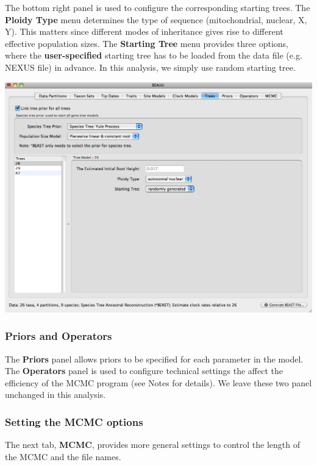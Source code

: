 \documentclass[12pt]{article}
\begin{document}
The bottom right panel is used to configure the corresponding starting trees. The \textbf{Ploidy Type} menu determines the type of sequence (mitochondrial, nuclear, X, Y). This matters since different modes of inheritance gives rise to different effective population sizes. The \textbf{Starting Tree} menu provides three options, where the \textbf{user-specified} starting tree has to be loaded from the data file (e.g. NEXUS file) in advance. In this analysis, we simply use random starting tree. 

\medskip{}

\includegraphics[scale=0.4]{figures/BEAUti_Tree}

\medskip{}

\subsubsection*{Priors and Operators}

The {\bf Priors} panel allows priors to be specified for each parameter in the model. The {\bf Operators} panel is used to configure technical settings the affect the efficiency of the MCMC program (see Notes for details). We leave these two panel unchanged in this analysis.

\subsubsection*{Setting the MCMC options }

The next tab, {\bf MCMC}, provides more general
settings to control the length of the MCMC and the file names. 
\end{document}
